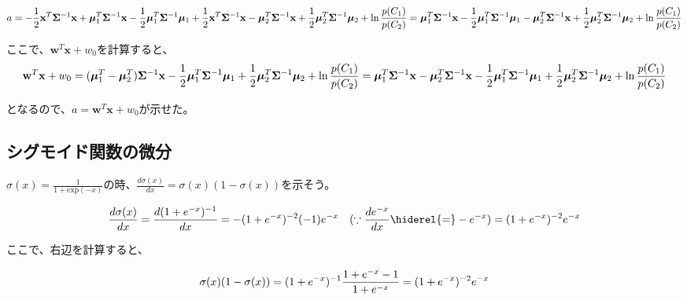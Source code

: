 \begin{dmath*}
a = -\frac{1}{2} \mathbf{x}^T  \mathbf{\Sigma}^{-1} \mathbf{x} +   \bm{\mu}_1^T \mathbf{\Sigma}^{-1}  \mathbf{x} 	-\frac{1}{2} \bm{\mu}_1^T \mathbf{\Sigma}^{-1}   \bm{\mu}_1  +\frac{1}{2} \mathbf{x}^T  \mathbf{\Sigma}^{-1} \mathbf{x} - \bm{\mu}_2^T \mathbf{\Sigma}^{-1}  \mathbf{x} + \frac{1}{2}  \bm{\mu}_2^T \mathbf{\Sigma}^{-1} \bm{\mu}_2+ \ln \frac{p(C_1)}{p(C_2)} \\
=  \bm{\mu}_1^T \mathbf{\Sigma}^{-1}  \mathbf{x} 	-\frac{1}{2} \bm{\mu}_1^T \mathbf{\Sigma}^{-1}   \bm{\mu}_1 - \bm{\mu}_2^T \mathbf{\Sigma}^{-1}  \mathbf{x} + \frac{1}{2}  \bm{\mu}_2^T \mathbf{\Sigma}^{-1} \bm{\mu}_2+\ln \frac{p(C_1)}{p(C_2)}
\end{dmath*}

ここで、$ \mathbf{w}^T\mathbf{x} + w_0$を計算すると、
\begin{dmath*}
\mathbf{w}^T\mathbf{x} + w_0 = ( \bm{\mu}_1^T - \bm{\mu}_2^T ) \mathbf{\Sigma}^{-1} \mathbf{x}-\frac{1}{2}\bm{\mu}_1^T \mathbf{\Sigma}^{-1} \bm{\mu}_1 + \frac{1}{2} \bm{\mu}_2^T \mathbf{\Sigma}^{-1} \bm{\mu}_2 +\ln \frac{p(C_1)}{p(C_2)} \\
= \bm{\mu}_1^T \mathbf{\Sigma}^{-1}\mathbf{x} - \bm{\mu}_2^T \mathbf{\Sigma}^{-1}\mathbf{x}-\frac{1}{2}\bm{\mu}_1^T \mathbf{\Sigma}^{-1} \bm{\mu}_1 + \frac{1}{2} \bm{\mu}_2^T \mathbf{\Sigma}^{-1} \bm{\mu}_2 +\ln \frac{p(C_1)}{p(C_2)}  
\end{dmath*}

となるので、$a = \mathbf{w}^T\mathbf{x} + w_0$が示せた。


\subsection*{シグモイド関数の微分}

$\sigma(x) = \frac{1}{1 + \mathrm{exp}(-x)}$の時、$\frac{d \sigma(x)}{dx}= \sigma(x)(1-\sigma(x))$を示そう。

\begin{dmath*}
\frac{d \sigma(x)}{dx}= \frac{d (1+e^{-x})^{-1}}{dx} = - (1+e^{-x})^{-2} (-1) e^{-x} \quad(\because \frac{d e^{-x}}{dx}\hiderel{=}-e^{-x} ) \\
= 	(1+e^{-x})^{-2} e^{-x}
\end{dmath*}

ここで、右辺を計算すると、

\begin{dmath*}
\sigma(x)(1-\sigma(x)) = (1+e^{-x})^{-1} \frac{1+e^{-x}-1}{1+e^{-x}} \\
= (1+e^{-x})^{-2} e^{-x} 
\end{dmath*}

